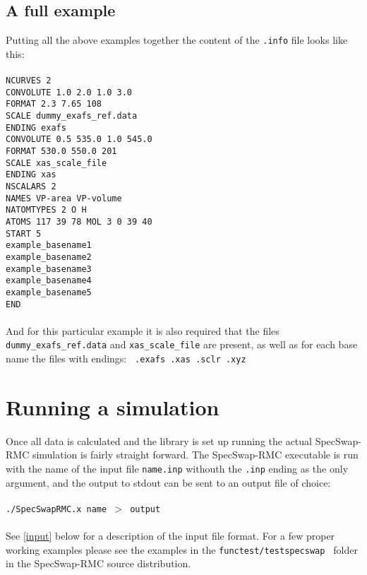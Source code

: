 \documentclass[a4paper, 10pt]{article}
\begin{document}
\subsection{A full example}
Putting all the above examples together the content of the {\tt .info}
file looks like this:\\\\
{\tt NCURVES 2}\\
{\tt CONVOLUTE 1.0 2.0 1.0 3.0}\\
{\tt FORMAT 2.3 7.65 108}\\
{\tt SCALE dummy\_exafs\_ref.data}\\
{\tt ENDING exafs}\\
{\tt CONVOLUTE 0.5 535.0 1.0 545.0}\\
{\tt FORMAT 530.0 550.0 201}\\
{\tt SCALE xas\_scale\_file}\\
{\tt ENDING xas}\\
{\tt NSCALARS 2}\\
{\tt NAMES VP-area VP-volume}\\
{\tt NATOMTYPES 2 O H}\\
{\tt ATOMS 117 39 78 MOL 3 0 39 40}\\
{\tt START 5}\\
{\tt example\_basename1}\\
{\tt example\_basename2}\\
{\tt example\_basename3}\\
{\tt example\_basename4}\\
{\tt example\_basename5}\\
{\tt END}\\\\
And for this particular example it is also required that the files {\tt
  dummy\_exafs\_ref.data} and {\tt xas\_scale\_file} are present, as well as for each base name the files with endings: {\tt
.exafs .xas .sclr .xyz}

\section{Running a simulation}
Once all data is calculated and the library is set up running the
actual SpecSwap-RMC simulation is fairly straight forward. The
SpecSwap-RMC executable is run with the name of the input file {\tt name.inp}
withouth the {\tt .inp} ending as the only argument, and the output to
stdout can be sent to an output file of choice:\\\\
{\tt ./SpecSwapRMC.x name $>$ output }\\\\
See \ref{input} below for a description of the input file
format. For a few proper working examples please see the examples
in the {\tt  functest/testspecswap } folder in the SpecSwap-RMC source
distribution.
\end{document}
